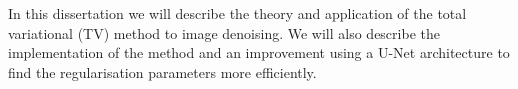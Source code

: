 \documentclass[12pt]{article}
\begin{document}







In this dissertation we will describe the theory and application of the total variational (TV) method to image denoising. 
We will also describe the implementation of the method and an improvement using a U-Net architecture to find the regularisation parameters more efficiently. 




\end{document}
